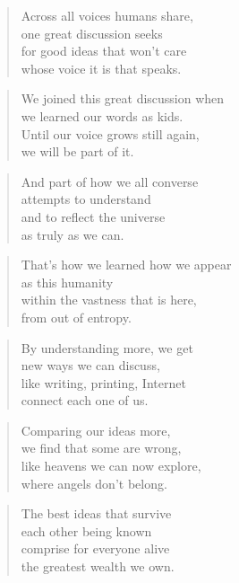 \documentclass[10pt,a4paper]{article}
\begin{document}
\begin{paracol}{2}
\begin{verse}
Across all voices humans share,\\
one great discussion seeks\\
for good ideas that won’t care\\
whose voice it is that speaks.
\end{verse}

\begin{verse}
We joined this great discussion when\\
we learned our words as kids.\\
Until our voice grows still again,\\
we will be part of it.
\end{verse}

\begin{verse}
And part of how we all converse\\
attempts to understand\\
and to reflect the universe\\
as truly as we can.
\end{verse}

\begin{verse}
That’s how we learned how we appear\\
as this humanity\\
within the vastness that is here,\\
from out of entropy.
\end{verse}

\begin{verse}
By understanding more, we get\\
new ways we can discuss,\\
like writing, printing, Internet\\
connect each one of us.
\end{verse}

\begin{verse}
Comparing our ideas more,\\
we find that some are wrong,\\
like heavens we can now explore,\\
where angels don’t belong.
\end{verse}

\begin{verse}
The best ideas that survive\\
each other being known\\
comprise for everyone alive\\
the greatest wealth we own.
\end{verse}


\end{paracol}
\end{document}
